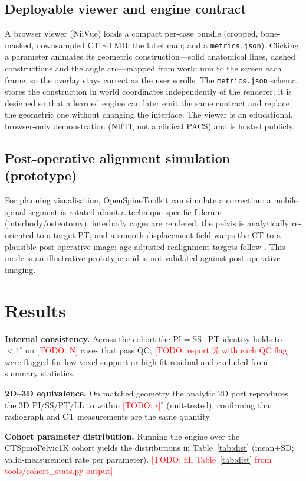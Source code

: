\documentclass[conference]{IEEEtran}
\newcommand{\TODO}[1]{\textcolor{red}{[TODO: #1]}}
\newcommand{\dataset}{CTSpinoPelvic1K}
\newcommand{\ostk}{OpenSpineToolkit}
\begin{document}
\subsection{Deployable viewer and engine contract}
A browser viewer (NiiVue) loads a compact per-case bundle (cropped, bone-masked,
downsampled CT $\sim$1\,MB; the label map; and a \texttt{metrics.json}). Clicking a
parameter animates its geometric construction---solid anatomical lines, dashed
constructions and the angle arc---mapped from world mm to the screen each frame, so the
overlay stays correct as the user scrolls. The \texttt{metrics.json} schema stores the
construction in world coordinates independently of the renderer; it is designed so that a
learned engine can later emit the same contract and replace the geometric one without
changing the interface. The viewer is an educational, browser-only demonstration (NIfTI,
not a clinical PACS) and is hosted publicly.

\subsection{Post-operative alignment simulation (prototype)}
For planning visualisation, \ostk{} can simulate a correction: a mobile spinal segment is
rotated about a technique-specific fulcrum (interbody/osteotomy), interbody cages are
rendered, the pelvis is analytically re-oriented to a target PT, and a smooth displacement
field warps the CT to a plausible post-operative image; age-adjusted realignment targets
follow \cite{lafage2016}. This mode is an illustrative prototype and is not validated
against post-operative imaging.

\section{Results}
\label{sec:results}
\textbf{Internal consistency.} Across the cohort the PI$=$SS$+$PT identity holds to
$<1^\circ$ on \TODO{N} cases that pass QC; \TODO{report \% with each QC flag} were flagged
for low voxel support or high fit residual and excluded from summary statistics.

\textbf{2D--3D equivalence.} On matched geometry the analytic 2D port reproduces the 3D
PI/SS/PT/LL to within \TODO{$\epsilon$}$^\circ$ (unit-tested), confirming that radiograph
and CT measurements are the same quantity.

\textbf{Cohort parameter distribution.} Running the engine over the \dataset{} cohort
yields the distributions in Table~\ref{tab:dist} (mean$\pm$SD; valid-measurement rate per
parameter). \TODO{fill Table~\ref{tab:dist} from tools/cohort\_stats.py output}
\end{document}
